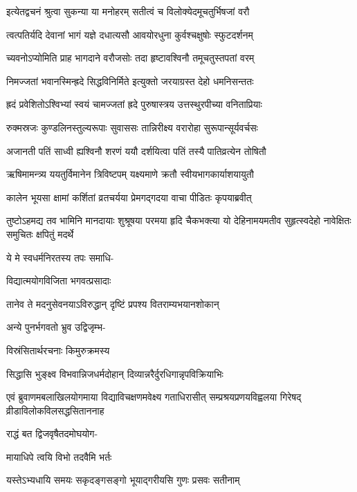 \twolineshloka
{इत्येतद्वचनं श्रुत्वा सुकन्या या मनोहरम्}
{सतीत्वं च विलोक्येदमूचतुर्भिषजां वरौ}%

\twolineshloka
{त्वत्पतिर्यदि देवानां भागं यज्ञे दधात्यसौ}
{आवयोरधुना कुर्वश्चक्षुषोः स्फुटदर्शनम्}%

\twolineshloka
{च्यवनोऽप्योमिति प्राह भागदाने वरौजसोः}
{तदा हृष्टावश्विनौ तमूचतुस्तपतां वरम्}%

\twolineshloka
{निमज्जतां भवानस्मिन्ह्रदे सिद्धविनिर्मिते}
{इत्युक्तो जरयाग्रस्त देहो धमनिसन्ततः}%

\twolineshloka
{ह्रदं प्रवेशितोऽश्विभ्यां स्वयं चामज्जतां ह्रदे}
{पुरुषास्त्रय उत्तस्थुरपीच्या वनिताप्रियाः}%

\twolineshloka
{रुक्मस्रजः कुण्डलिनस्तुल्यरूपाः सुवाससः}
{तान्निरीक्ष्य वरारोहा सुरूपान्सूर्यवर्चसः}%

\twolineshloka
{अजानती पतिं साध्वी ह्यश्विनौ शरणं ययौ}
{दर्शयित्वा पतिं तस्यै पातिव्रत्येन तोषितौ}%

\twolineshloka
{ऋषिमामन्त्र्य ययतुर्विमानेन त्रिविष्टपम्}
{यक्ष्यमाणे क्रतौ स्वीयभागकार्याशयायुतौ}%

\twolineshloka
{कालेन भूयसा क्षामां कर्शितां व्रतचर्यया}
{प्रेमगद्गदया वाचा पीडितः कृपयाब्रवीत्}%

\fourlineindentedshloka
{तुष्टोऽहमद्य तव भामिनि मानदायाः}
{शुश्रूषया परमया हृदि चैकभक्त्या}
{यो देहिनामयमतीव सुहृत्स्वदेहो}
{नावेक्षितः समुचितः क्षपितुं मदर्थे}%

ये मे स्वधर्मनिरतस्य तपः समाधि-

विद्यात्मयोगविजिता भगवत्प्रसादाः

\twolineshloka
{तानेव ते मदनुसेवनयाऽविरुद्धान्}
{दृष्टिं प्रपश्य वितराम्यभयानशोकान्}%

अन्ये पुनर्भगवतो भ्रुव उद्विजृम्भ-

विस्रंसितार्थरचनाः किमुरुक्रमस्य

\twolineshloka
{सिद्धासि भुङ्क्ष्व विभवान्निजधर्मदोहान्}
{दिव्यान्नरैर्दुरधिगान्नृपविक्रियाभिः}%

\fourlineindentedshloka
{एवं ब्रुवाणमबलाखिलयोगमाया}
{विद्याविचक्षणमवेक्ष्य गताधिरासीत्}
{सम्प्रश्रयप्रणयविह्वलया गिरेषद्}
{व्रीडाविलोकविलसद्धसिताननाह}%


राद्धं बत द्विजवृषैतदमोघयोग-

मायाधिपे त्वयि विभो तदवैमि भर्तः

\twolineshloka
{यस्तेऽभ्यधायि समयः सकृदङ्गसङ्गो}
{भूयाद्गरीयसि गुणः प्रसवः सतीनाम्}%

